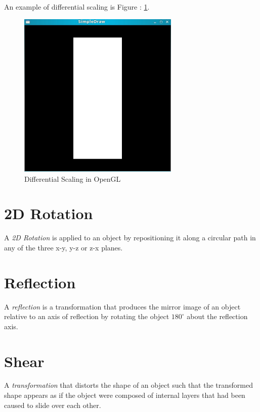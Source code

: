 \documentclass[a4paper,12pt,titlepage,twosided]{article}
\begin{document}
	An example of differential scaling is Figure : \ref{fig:differential_scaling}.
	\begin{figure}
		\includegraphics[height=80mm]{Images_final/Square_non_uniform_scaling.jpg}
		\caption{Differential Scaling in OpenGL}
		\label{fig:differential_scaling}
	\end{figure}

\pagebreak
\section{2D Rotation}

A \emph{2D Rotation} is applied to an object by repositioning it along a circular path in any of the three x-y, y-z or z-x planes.

\pagebreak
\section{Reflection}
A \emph{reflection} is a transformation that produces the mirror image of an object relative to an axis of reflection by rotating the object $180^\circ$ about the reflection axis. 
\pagebreak
\section{Shear}
A \emph{transformation} that distorts the shape of an object such that the transformed shape appears as if the object were composed of internal layers that had been caused to slide over each other.

\pagebreak
\end{document}
